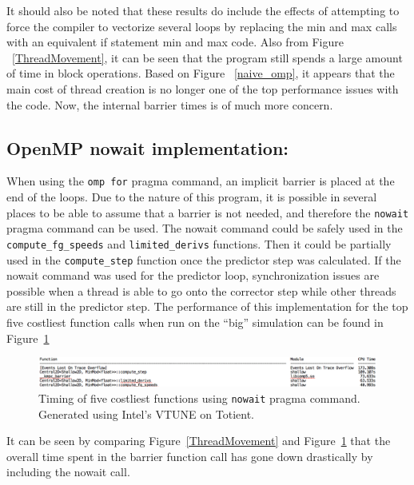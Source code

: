 \documentclass[12pt]{article}
\begin{document}
		\noindent It should also be noted that these results do include the effects of attempting to force the compiler to vectorize several loops by replacing the min and max calls with an equivalent if statement min and max code. Also from Figure ~\ref{ThreadMovement}, it can be seen that the program still spends a large amount of time in block operations. Based on Figure ~\ref{naive_omp}, it appears that the main cost of thread creation is no longer one of the top performance issues with the code. Now, the internal barrier times is of much more concern.
		
		\subsection{OpenMP nowait implementation:}
		When using the \texttt{omp for} pragma command, an implicit barrier is placed at the end of the loops. Due to the nature of this program, it is possible in several places to be able to assume that a barrier is not needed, and therefore the \texttt{nowait} pragma command can be used. The nowait command could be safely used in the \texttt{compute\_fg\_speeds} and \texttt{limited\_derivs} functions. Then it could be partially used in the \texttt{compute\_step} function once the predictor step was calculated. If the nowait command was used for the predictor loop, synchronization issues are possible when a thread is able to go onto the corrector step while other threads are still in the predictor step. The performance of this implementation for the top five costliest function calls when run on the ``big'' simulation can be found in Figure~\ref{bindoff}
		
		\begin{figure}[h]
			\begin{center}
				\includegraphics[width=0.8\columnwidth]{bindoff}
				\caption{Timing of five costliest functions using \texttt{nowait} pragma command. Generated using Intel's VTUNE on Totient.}
				\label{bindoff}
			\end{center}
		\end{figure}
		
		\noindent It can be seen by comparing Figure~\ref{ThreadMovement} and Figure~\ref{bindoff} that the overall time spent in the barrier function call has gone down drastically by including the nowait call.
		
\end{document}
